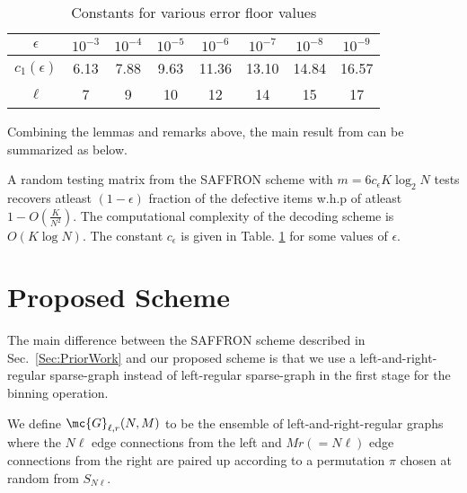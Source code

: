 \documentclass[conference,twocolumn]{IEEEtran}
\def\ceps{c_{\epsilon}}
\begin{document}
\begin{table}[t]
\centering
\begin{tabular}{| c | c | c | c | c | c | c | c | }
\hline
$\epsilon$ & $10^{-3}$ & $10^{-4}$ & $10^{-5}$ & $10^{-6}$ &$ 10^{-7}$ & $10^{-8}$ & $10^{-9}$ \\ \hline
$c_1(\epsilon)$ & 6.13 & 7.88 & 9.63 & 11.36 & 13.10 & 14.84 & 16.57 \\ \hline
 $\ell$ & 7 & 9 & 10 & 12 & 14 & 15 & 17 \\ \hline
\end{tabular}
\vspace{1ex}
\caption{Constants for various error floor values}
\label{Table:constantsDE}
\end{table}

Combining the lemmas and remarks above, the main result from \cite{lee2015saffron} can be summarized as below.
\begin{theorem}
A random testing matrix from the SAFFRON scheme with $m=6\ceps K \log_{2}N$ tests recovers atleast $(1-\epsilon)$ fraction of the defective items w.h.p of atleast $1-O(\frac{K}{N^2})$. The computational complexity of the decoding scheme is $O(K\log N)$. The constant $\ceps$ is given in Table. \ref{Table:constantsDE} for some values of $\epsilon$.
\end{theorem}

\section{Proposed Scheme}
The main difference between the SAFFRON scheme described in Sec.~\ref{Sec:PriorWork} and our proposed scheme is that we use a left-and-right-regular sparse-graph instead of left-regular sparse-graph in the first stage for the binning operation.

\begin{definition}
We define $\mc{G}_{\ell,r}(N,M)$ to be the ensemble of left-and-right-regular graphs where the $N\ell$ edge connections from the left and $Mr(=N\ell)$ edge connections from the right are paired up according to a permutation $\pi$ chosen at random from $S_{N\ell}$. 
\end{definition}
\end{document}
